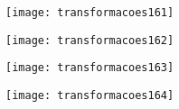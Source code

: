 
\begin{figure}[H]
\centering

\texttt{[image: transformacoes161]}
\end{figure}


\begin{figure}[H]
\centering

\texttt{[image: transformacoes162]}
\end{figure}

\begin{figure}[H]
\centering

\texttt{[image: transformacoes163]}
\end{figure}

\begin{figure}[H]
\centering

\texttt{[image: transformacoes164]}
\end{figure}








\nocite{*}